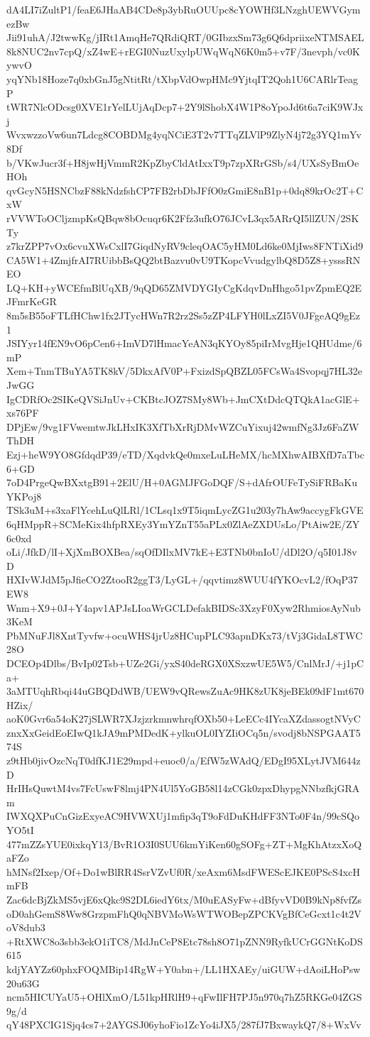 dA4LI7iZultP1/feaE6JHaAB4CDe8p3ybRuOUUpc8cYOWHf3LNzghUEWVGymezBw
Jii91uhA/J2twwKg/jIRt1AmqHe7QRdiQRT/0GIbzxSm73g6Q6dpriixeNTMSAEL
8k8NUC2nv7cpQ/xZ4wE+rEGI0NuzUxylpUWqWqN6K0m5+v7F/3nevph/vc0KywvO
yqYNb18Hoze7q0xbGnJ5gNtitRt/tXbpVdOwpHMc9YjtqIT2Qoh1U6CARlrTeagP
tWR7NlcODcsg0XVE1rYelLUjAqDcp7+2Y9lShobX4W1P8oYpoJd6t6a7ciK9WJxj
WvxwzzoVw6un7Ldcg8COBDMg4yqNCiE3T2v7TTqZLVlP9ZlyN4j72g3YQ1mYv8Df
b/VKwJucr3f+H8jwHjVmmR2KpZbyCldAtIxxT9p7zpXRrGSb/s4/UXsSyBmOeHOh
qvGcyN5HSNCbzF88kNdzfshCP7FB2rbDbJFfO0zGmiE8nB1p+0dq89krOc2T+CxW
rVVWToOCljzmpKsQBqw8bOcuqr6K2Ffz3ufkO76JCvL3qx5ARrQI5llZUN/2SKTy
z7krZPP7vOx6cvuXWsCxlI7GiqdNyRV9cleqOAC5yHM0Ld6ke0MjIws8FNTiXid9
CA5W1+4ZmjfrAI7RUibbBsQQ2btBazvu0vU9TKopcVvudgylbQ8D5Z8+ysssRNEO
LQ+KH+yWCEfmBlUqXB/9qQD65ZMVDYGIyCgKdqvDnHhgo51pvZpmEQ2EJFmrKeGR
8m5sB55oFTLfHChw1fx2JTycHWn7R2rz2Ss5zZP4LFYH0lLxZI5V0JFgeAQ9gEz1
JSIYyr14fEN9vO6pCen6+ImVD7lHmacYeAN3qKYOy85piIrMvgHje1QHUdme/6mP
Xem+TnmTBuYA5TK8kV/5DkxAfV0P+FxizdSpQBZL05FCsWa4Svopqj7HL32eJwGG
IgCDRfOc2SIKeQVSiJnUv+CKBtcJOZ7SMy8Wb+JmCXtDdcQTQkA1acGlE+xs76PF
DPjEw/9vg1FVwemtwJkLHxIK3XfTbXrRjDMvWZCuYixuj42wmfNg3Jz6FaZWThDH
Ezj+heW9YO8GfdqdP39/eTD/XqdvkQe0mxeLuLHeMX/hcMXhwAIBXfD7aTbc6+GD
7oD4PrgeQwBXxtgB91+2ElU/H+0AGMJFGoDQF/S+dAfrOUFeTySiFRBaKuYKPoj8
TSk3uM+s3xaFlYcehLuQlLRl/1CLsq1x9T5iqmLycZG1u203y7hAw9accygFkGVE
6qHMppR+SCMeKix4hfpRXEy3YmYZnT55aPLx0ZlAeZXDUsLo/PtAiw2E/ZY6c0xd
oLi/JfkD/lI+XjXmBOXBea/sqOfDIlxMV7kE+E3TNb0bnIoU/dDl2O/q5I01J8vD
HXIvWJdM5pJfieCO2ZtooR2ggT3/LyGL+/qqvtimz8WUU4fYKOcvL2/fOqP37EW8
Wnm+X9+0J+Y4apv1APJsLIoaWrGCLDefakBIDSc3XzyF0Xyw2RhmiosAyNub3KeM
PbMNuFJl8XntTyvfw+ocuWHS4jrUz8HCupPLC93apnDKx73/tVj3GidaL8TWC28O
DCEOp4Dlbs/BvIp02Tsb+UZe2Gi/yxS40deRGX0XSxzwUE5W5/CnlMrJ/+j1pCa+
3aMTUqhRbqi44uGBQDdWB/UEW9vQRewsZuAc9HK8zUK8jeBEk09dF1mt670HZix/
aoK0Gvr6a54oK27jSLWR7XJzjzrkmnwhrqfOXb50+LeECc4IYcaXZdassogtNVyC
znxXxGeidEoEIwQ1kJA9mPMDedK+ylkuOL0IYZIiOCq5n/svodj8bNSPGAAT574S
z9tHb0jivOzcNqT0dfKJ1E29mpd+euoc0/a/EfW5zWAdQ/EDgI95XLytJVM644zD
HrIHsQuwtM4vs7FcUswF8lmj4PN4Ul5YoGB58l14zCGk0zpxDhypgNNbzfkjGRAm
IWXQXPuCnGizExyeAC9HVWXUj1mfip3qT9oFdDuKHdFF3NTo0F4n/99cSQoYO5tI
477mZZsYUE0ixkqY13/BvR1O3I0SUU6kmYiKen60gSOFg+ZT+MgKhAtzxXoQaFZo
hMNsf2Ixep/Of+Do1wBlRR4SsrVZvUf0R/xeAxm6MsdFWEScEJKE0PScS4xcHmFB
Zac6dcBjZkMS5vjE6xQkc9S2DL6iedY6tx/M0uEASyFw+dBfyvVD0B9kNp8fvfZs
oD0ahGemS8Ww8GrzpmFhQ0qNBVMoWsWTWOBepZPCKVgBfCeGcxt1c4t2VoV8dub3
+RtXWC8o3sbb3ekO1iTC8/MdJnCeP8Etc78sh8O71pZNN9RyfkUCrGGNtKoDS615
kdjYAYZz60phxFOQMBip14RgW+Y0abn+/LL1HXAEy/uiGUW+dAoiLHoPsw20u63G
ncm5HICUYaU5+OHlXmO/L51kpHRlH9+qFwIlFH7PJ5n970q7hZ5RKGe04ZGS9g/d
qY48PXCIG1Sjq4cs7+2AYGSJ06yhoFio1ZcYo4iJX5/287fJ7BxwaykQ7/8+WxVv
